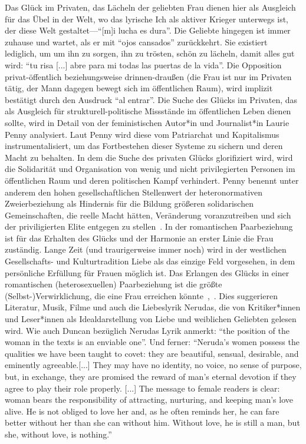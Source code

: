 Das Glück im Privaten, das Lächeln der geliebten Frau dienen hier als Ausgleich für das Übel in der Welt, wo das lyrische Ich als aktiver Krieger unterwegs ist, der diese Welt gestaltet—``[m]i lucha es dura''.
Die Geliebte hingegen ist immer zuhause und wartet, als er mit ``ojos cansados'' zurückkehrt.
Sie existiert lediglich, um um ihn zu sorgen, ihn zu trösten, schön zu lächeln, damit alles gut wird: ``tu risa [...] abre para mi todas las puertas de la vida''.
Die Opposition privat-öffentlich beziehungsweise drinnen-draußen (die Frau ist nur im Privaten tätig, der Mann dagegen bewegt sich im öffentlichen Raum), wird implizit bestätigt durch den Ausdruck ``al entrar''.
Die Suche des Glücks im Privaten, das als Ausgleich für strukturell-politische Missstände im öffentlichen Leben dienen sollte, wird in Detail von der feministischen Autor*in und Journalist*in Laurie Penny analysiert.
Laut Penny wird diese vom Patriarchat und Kapitalismus instrumentalisiert, um das Fortbestehen dieser Systeme zu sichern und deren Macht zu behalten.
In dem die Suche des privaten Glücks glorifiziert wird, wird die Solidarität und Organisation von wenig und nicht privilegierten Personen im öffentlichen Raum und deren politischen Kampf verhindert.
Penny benennt unter anderem den hohen gesellschaftlichen Stellenwert der heteronormativen Zweierbeziehung als Hindernis für die Bildung größeren solidarischen Gemeinschaften, die reelle Macht hätten, Veränderung voranzutreiben und sich der priviligierten Elite entgegen zu stellen~\cite{Penny2014}.
In der romantischen Paarbeziehung ist für das Erhalten des Glücks und der Harmonie an erster Linie die Frau zuständig.
Lange Zeit (und traurigerweise immer noch) wird in der westlichen Gesellschafts- und Kulturtradition Liebe als das einzige Feld vorgesehen, in dem persönliche Erfüllung für Frauen möglich ist. %
Das Erlangen des Glücks in einer romantischen (heterosexuellen) Paarbeziehung ist die größte (Selbst-)Verwirklichung, die eine Frau erreichen könnte~\cite{Duncan1992},~\cite{Penny2014}.
Dies suggerieren Literatur, Musik, Filme und auch die Liebeslyrik Nerudas, die von Kritiker*innen und Leser*innen als Idealdarstellung von Liebe und weiblichen Geliebten gelesen wird.
Wie auch Duncan bezüglich Nerudas Lyrik anmerkt: ``the position of the woman in the texts is an enviable one''.
Und ferner: ``Neruda's women possess the qualities we have been taught to covet: they are beautiful,  sensual, desirable, and eminently agreeable.[...] They may have no identity, no voice, no sense of purpose, but, in exchange, they are promised the reward of man's eternal devotion if they agree to play their role properly.
[...] The message to  female readers is clear: woman bears the responsibility of attracting, nurturing, and keeping man's love alive. He is not obliged to love her and, as he often reminds her, he can fare better without her than she  can without him. Without love, he is still a man, but she, without love, is nothing.''

